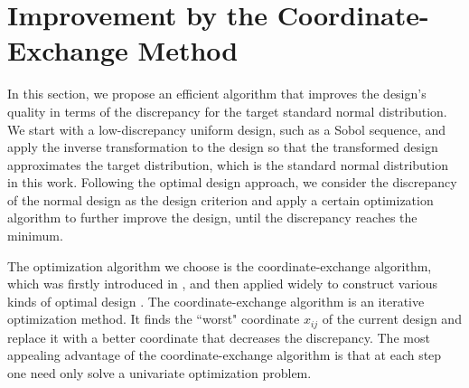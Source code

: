 \documentclass[graybox]{svmult}
\newcommand{\vPsi}{\boldsymbol{\Psi}}
\newcommand{\Udes}{\mathcal{U}}
\newcommand{\unif}{\textup{unif}}
\newcommand{\normal}{\textup{normal}}
\begin{document}
\begin{example}

\end{example}

\section{Improvement by the Coordinate-Exchange Method}\label{sec:CoordEx}

In this section, we propose an efficient algorithm that improves the design's quality in terms of the discrepancy for the target standard normal distribution. 
We start with a low-discrepancy uniform design, such as a Sobol sequence, and apply the inverse transformation to the design so that the transformed design approximates the target distribution, which is the standard normal distribution in this work. 
Following the optimal design approach, we consider the discrepancy of the normal design as the design criterion and apply a certain optimization algorithm to further improve the design, until the discrepancy reaches the minimum.

The optimization algorithm we choose is the coordinate-exchange algorithm, which was firstly introduced in \cite{meyer1995coordinate}, and then applied widely to construct various kinds of optimal design \cite{sambo2014coordinate,overstall2017bayesian,kang2018stochastic}. 
The coordinate-exchange algorithm is an iterative optimization method.
It finds the ``worst" coordinate $x_{ij}$ of the current design and replace it with a better coordinate that decreases the discrepancy. 
The most appealing advantage of the coordinate-exchange algorithm is that at each step one need only solve a univariate optimization problem.
\end{document}
